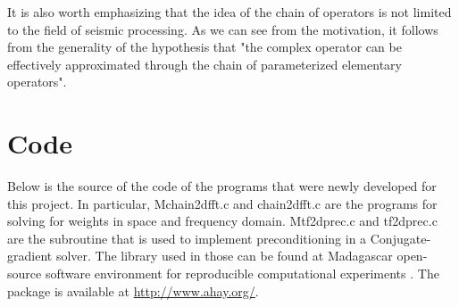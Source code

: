 It is also worth emphasizing that the idea of the chain of operators is not limited to the field of seismic processing. As we can see from the motivation, it follows from the generality of the hypothesis that "the complex operator can be effectively approximated through the chain of parameterized elementary operators".

\appendix
\section{Code}
Below is the source of the code of the programs that were newly developed for this project. In particular, Mchain2dfft.c and chain2dfft.c are the programs for solving for weights in space and frequency domain. Mtf2dprec.c and tf2dprec.c are the subroutine that is used to implement preconditioning in a Conjugate-gradient solver. The library used in those can be found at Madagascar open-source software environment for reproducible computational experiments \cite[]{madagascar}. The package is available at \url{http://www.ahay.org/}.


